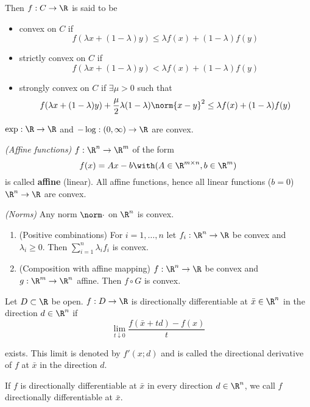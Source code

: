 Then $f:C\to\R$ is said to be

\begin{itemize}
	\item convex on $C$ if
	      $$f(\lambda x+(1-\lambda)y)\leq\lambda f(x)+(1-\lambda)f(y)$$
	\item strictly convex on $C$ if
	      $$f(\lambda x+(1-\lambda)y)<\lambda f(x)+(1-\lambda)f(y)$$
	\item strongly convex on $C$ if $\exists\mu>0$ such that
	      $$f(\lambda x+(1-\lambda)y)+\frac{\mu}{2}\lambda(1-\lambda)\norm{x-y}^2\leq\lambda f(x)+(1-\lambda)f(y)$$
\end{itemize}

\label{f96c8ae}

\begin{enumerata}
	\item $\exp:\R\to\R$ and $-\log:(0,\infty)\to\R$ are convex.
	\item \textit{(Affine functions)} $f:\R^n\to\R^m$ of the form
	$$
		f(x)=Ax-b\with(A\in\R^{m\times n},b\in\R^m)
	$$
	is called \textbf{affine} (linear). All affine functions, hence
	all linear functions ($b=0$) $\R^n\to\R$ are convex.
	\item \textit{(Norms)} Any norm $\norm\cdot$ on $\R^n$ is convex.
\end{enumerata}

\label{ddce2a7}

\begin{enumerate}
	\item (Positive combinations) For $i=1,\ldots,n$ let $f_i:\R^n\to\R$ be
	      convex and $\lambda_i\geq0$. Then $\sum_{i=1}^n\lambda_if_i$ is
	      convex.
	\item (Composition with affine mapping) $f:\R^n\to\R$ be convex
	      and $g:\R^m\to\R^n$ affine. Then $f\circ G$ is convex.
\end{enumerate}

\label{37eb747}

Let $D\subset \R$ be open. $f:D\to\R$ is directionally differentiable
at $\bar x\in\R^n$ in the direction $d\in\R^n$ if
$$
	\lim_{t\downarrow0}\frac{f(\bar x+td)-f(x)}t
$$

exists. This limit is denoted by $f'(x;d)$ and is called the
directional derivative of $f$ at $\bar x$ in the direction $d$.

If $f$ is directionally differentiable at $\bar x$ in every direction
$d\in\R^n$, we call $f$ directionally differentiable at $\bar x$.

